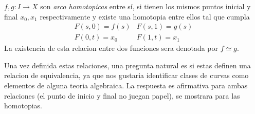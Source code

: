 \begin{definicion}
  \(f,g : I \to X\) son \emph{arco homotopicas} entre sí, si tienen los mismos
  puntos inicial y final \(x_0, x_1\) respectivamente y existe una homotopia entre
  ellos tal que cumpla
  \[
    \begin{matrix}
      F(s,0) = f(s) & F(s,1) = g(s) \\
      F(0,t) = x_0  & F(1,t) = x_1
    \end{matrix}
  \]
  La existencia de esta relacion entre dos funciones sera denotada por
  \(f \simeq g\).
\end{definicion}
Una vez definida estas relaciones, una pregunta natural es si estas definen
una relacion de equivalencia, ya que nos gustaria identificar clases de
curvas como elementos de alguna teoria algebraica. La respuesta es
afirmativa para ambas relaciones (el punto de inicio y final no juegan
papel), se mostrara para las homotopias.

